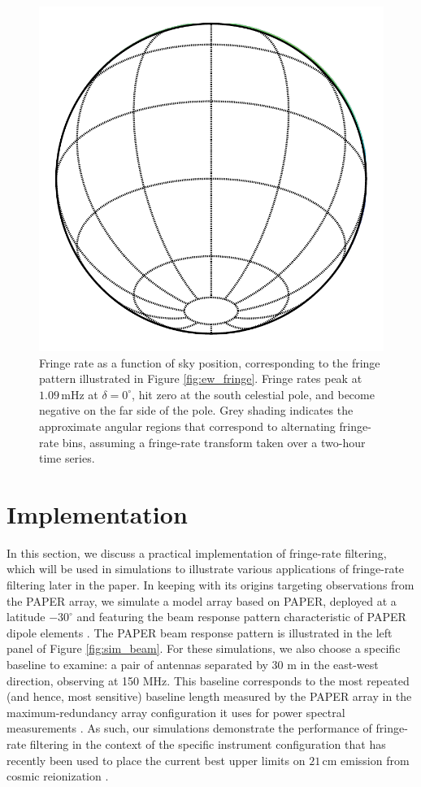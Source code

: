 \documentclass[twocolumn,apj,numberedappendix]{emulateapj}
\begin{document}
\begin{figure}
\includegraphics[width=.9\columnwidth]{plots/fringe_contours}
\caption{
Fringe rate as a function of sky position, corresponding to the fringe pattern illustrated in
Figure \ref{fig:ew_fringe}.  Fringe rates peak at $1.09\,\textrm{mHz}$ at $\delta=0^\circ$, hit zero at
the south celestial pole, and become negative on the far side of the pole.  Grey shading indicates
the approximate angular regions that correspond to alternating fringe-rate bins, assuming a
fringe-rate transform taken over a two-hour time series.
}\label{fig:fringe_contours}
\end{figure}



\section{Implementation}
\label{sec:Implementation}

In this section, we discuss a practical implementation of fringe-rate filtering, which will be used in simulations to illustrate various applications of fringe-rate filtering later in the paper. In keeping with its origins targeting observations from the
PAPER array, we simulate a model array based on PAPER, deployed at a latitude $-30^\circ$
and featuring the beam response pattern characteristic of PAPER dipole elements \citep{parsons_et_al2008,pober_et_al2012}.
The PAPER beam response pattern is illustrated in the left panel of Figure \ref{fig:sim_beam}.
For these simulations, we also choose a specific baseline to examine: a pair of antennas separated by 30 m in the 
east-west direction, observing at 150 MHz.  This baseline corresponds to the most repeated (and hence,
most sensitive) baseline length measured by the PAPER array in the maximum-redundancy array configuration it uses
for power spectral measurements \citep{parsons_et_al2012a,P14,ali_et_al2015}.  As such, our simulations demonstrate the performance of fringe-rate filtering in the context of the specific instrument configuration
that has recently been used to place the current best upper limits on $21\,\textrm{cm}$ emission from cosmic reionization \citep{P14,J14}.
\end{document}
